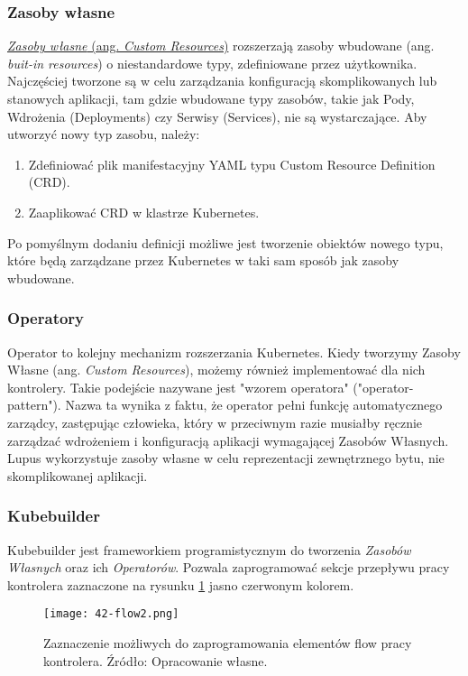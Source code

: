 \subsubsection{Zasoby własne} 

\hyperlink{def:zasoby-wlasne}{\textit{Zasoby własne} (ang. \textit{Custom Resources})} rozszerzają zasoby wbudowane (ang. \textit{buit-in resources}) o niestandardowe typy, zdefiniowane przez użytkownika. Najczęściej tworzone są w celu zarządzania konfiguracją skomplikowanych lub stanowych aplikacji, tam gdzie wbudowane typy zasobów, takie jak Pody, Wdrożenia (Deployments) czy Serwisy (Services), nie są wystarczające. Aby utworzyć nowy typ zasobu, należy:
\begin{enumerate}
    \item Zdefiniować plik manifestacyjny YAML typu Custom Resource Definition (CRD).
    \item Zaaplikować CRD w klastrze Kubernetes.
\end{enumerate}

Po pomyślnym dodaniu definicji możliwe jest tworzenie obiektów nowego typu, które będą zarządzane przez Kubernetes w taki sam sposób jak zasoby wbudowane.

\subsubsection{Operatory}

Operator to kolejny mechanizm rozszerzania Kubernetes. Kiedy tworzymy Zasoby Własne (ang. \textit{Custom Resources}), możemy również implementować dla nich kontrolery. Takie podejście nazywane jest "wzorem operatora" ("operator-pattern"). Nazwa ta wynika z faktu, że operator pełni funkcję automatycznego zarządcy, zastępując człowieka, który w przeciwnym razie musiałby ręcznie zarządzać wdrożeniem i konfiguracją aplikacji wymagającej Zasobów Własnych. Lupus wykorzystuje zasoby własne w celu reprezentacji zewnętrznego bytu, nie skomplikowanej aplikacji.
\subsubsection{Kubebuilder}

Kubebuilder jest frameworkiem programistycznym do tworzenia \textit{Zasobów Własnych} oraz ich \textit{Operatorów}. Pozwala zaprogramować sekcje przepływu pracy kontrolera zaznaczone na rysunku \ref{fig:42-flow2} jasno czerwonym kolorem.


\begin{figure}[!h]
    \centering \texttt{[image: 42-flow2.png]}
    \caption{Zaznaczenie możliwych do zaprogramowania elementów flow pracy kontrolera. Źródło: Opracowanie własne.}\label{fig:42-flow2}
\end{figure}